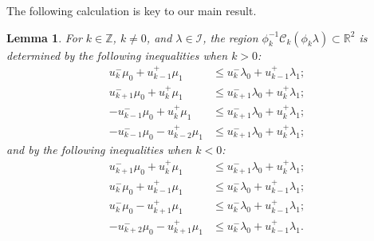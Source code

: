 \documentclass[pdflatex,sn-mathphys]{sn-jnl}%
\theoremstyle{thmstyleone}%
\newtheorem{lemma}[theorem]{Lemma}
\theoremstyle{thmstyletwo}%
\theoremstyle{thmstylethree}%
\newcommand{\cC}{\mathcal{C}}
\newcommand{\cI}{\mathcal{I}}
\newcommand{\RR}{\mathbb{R}}
\newcommand{\ZZ}{\mathbb{Z}}
\begin{document}
  The following calculation is key to our main result.
  \begin{lemma}
    \label{le:dominance inequalities}
    For $k\in\ZZ$, $k\ne0$, and $\lambda\in\cI$, the region $\phi_k^{-1}\cC_k(\phi_k\lambda)\subset\RR^2$ is determined by the following inequalities when $k>0$:
    \begin{align}
      \label{ineq:1} u_k^-\mu_0+u_{k-1}^+\mu_1 &\le u_k^-\lambda_0+u_{k-1}^+\lambda_1;\\
      \label{ineq:2} u_{k+1}^-\mu_0+u_k^+\mu_1 &\le u_{k+1}^-\lambda_0+u_k^+\lambda_1;\\
      \label{ineq:3} -u_{k-1}^-\mu_0+u_k^+\mu_1 &\le u_{k+1}^-\lambda_0+u_k^+\lambda_1;\\
      \label{ineq:4} -u_{k-1}^-\mu_0-u_{k-2}^+\mu_1 &\le u_{k+1}^-\lambda_0+u_k^+\lambda_1;
    \end{align}
    and by the following inequalities when $k<0$:
    \begin{align*}
      u_{k+1}^-\mu_0+u_k^+\mu_1 &\le u_{k+1}^-\lambda_0+u_k^+\lambda_1;\\
      u_k^-\mu_0+u_{k-1}^+\mu_1 &\le u_k^-\lambda_0+u_{k-1}^+\lambda_1;\\
      u_k^-\mu_0-u_{k+1}^+\mu_1 &\le u_k^-\lambda_0+u_{k-1}^+\lambda_1;\\
      -u_{k+2}^-\mu_0-u_{k+1}^+\mu_1 &\le u_k^-\lambda_0+u_{k-1}^+\lambda_1.
    \end{align*}
    

\end{lemma}
\end{document}
